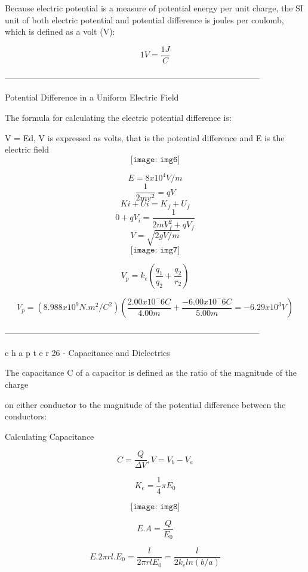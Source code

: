 \documentclass[11pt] {article}
\begin{document}
Because electric potential is a measure of potential energy per unit charge, the SI unit of both electric potential and potential difference is joules per coulomb, which is defined as a volt (V):

$$1V = \frac{1J} {C}$$


--------------------------------------------------------------------------------------------
\begin{center}
Potential Difference in a Uniform Electric Field
\end{center}

The formula for calculating the electric potential difference is:

V = Ed, V is expressed as volts, that is the potential difference and E is the electric field
\vspace{10mm} %
$$\texttt{[image: img6]}$$

$$E = 8 x 10^4 V/m$$
$$\frac{1}{2 mv^2} = qV$$
$$Ki + Ui = K_f + U_f$$
$$0 + qV_i = \frac{1}{2mV_f^2 + qV_f}$$
$$V = \sqrt{2gV/m} $$
\vspace{20mm} %
$$\texttt{[image: img7]}$$

$$V_p = k_e(\frac{q_1}{q_2} + \frac{q_2}{r_2})$$

$$V_p = (8.988 x 10^9 N . m^2/C^2)(\frac{2.00 x 10^-6 C} {4.00m} + \frac{-6.00 x 10^-6C} {5.00m} = -6.29 x 10^3V)$$

\vspace{20mm} %
--------------------------------------------------------------------------------------------
\begin{center}
c h a p t e r 26 -  Capacitance and Dielectrics
\end{center}
The capacitance C of a capacitor is defined as the ratio of the magnitude of the charge

on either conductor to the magnitude of the potential difference between the conductors:

\begin{center}
Calculating Capacitance
\end{center}
$$C = \frac{Q}{\Delta{V}}, V = V_b - V_a$$

$$K_e = \frac{1}{4} {\pi{E_0}}$$

\vspace{25mm} %
$$\texttt{[image: img8]}$$

$$E . A = \frac{Q}{E_0}$$

$$E . 2\pi{rl.E_0} = \frac{l}{2\pi{rlE_0}} =  \frac{l}{2k_eln(b/a)}$$
\end{document}
